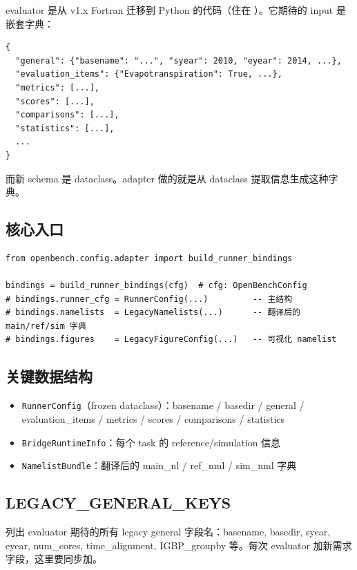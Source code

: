 evaluator 是从 v1.x Fortran 迁移到 Python 的代码（住在 ）。它期待的 input 是嵌套字典：

\begin{verbatim}
{
  "general": {"basename": "...", "syear": 2010, "eyear": 2014, ...},
  "evaluation_items": {"Evapotranspiration": True, ...},
  "metrics": [...],
  "scores": [...],
  "comparisons": [...],
  "statistics": [...],
  ...
}
\end{verbatim}

而新 schema 是 dataclass。adapter 做的就是从 dataclass 提取信息生成这种字典。

\subsection{核心入口}

\begin{verbatim}
from openbench.config.adapter import build_runner_bindings

bindings = build_runner_bindings(cfg)  # cfg: OpenBenchConfig
# bindings.runner_cfg = RunnerConfig(...)         -- 主结构
# bindings.namelists  = LegacyNamelists(...)      -- 翻译后的 main/ref/sim 字典
# bindings.figures    = LegacyFigureConfig(...)   -- 可视化 namelist
\end{verbatim}

\subsection{关键数据结构}

\begin{itemize}
  \item \texttt{RunnerConfig}（frozen dataclass）：basename / basedir / general / evaluation\_items / metrics / scores / comparisons / statistics
  \item \texttt{BridgeRuntimeInfo}：每个 task 的 reference/simulation 信息
  \item \texttt{NamelistBundle}：翻译后的 main\_nl / ref\_nml / sim\_nml 字典
\end{itemize}

\subsection{LEGACY\_GENERAL\_KEYS}

 列出 evaluator 期待的所有 legacy general 字段名：basename, basedir, syear, eyear, num\_cores, time\_alignment, IGBP\_groupby 等。每次 evaluator 加新需求字段，这里要同步加。

